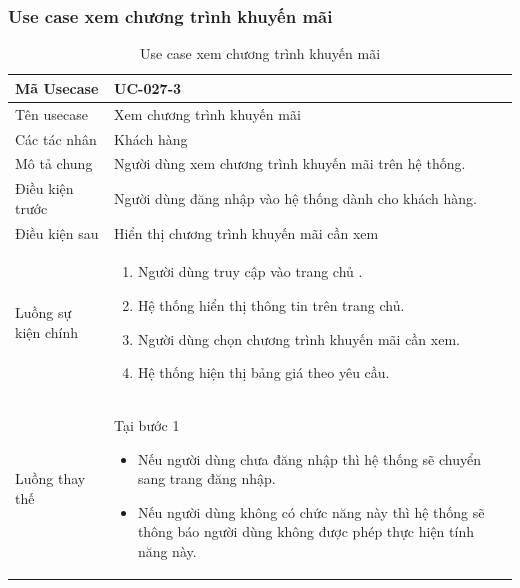 \documentclass[12pt,a4paper]{article}
\begin{document}

    \subsubsection*{Use case xem chương trình khuyến mãi}
    \begin{table}[H]
        \centering
        \begin{tabular}{|p{3.5cm}|p{11.5cm}|c|}
            \hline
            Mã Usecase      & UC-027-3                                               \\
            \hline
            Tên usecase     & Xem chương trình khuyến mãi                            \\
            \hline
            Các tác nhân    & Khách hàng                                             \\
            \hline
            Mô tả chung     & Người dùng xem chương trình khuyến mãi trên hệ thống.  \\
            \hline

            Điều kiện trước & Người dùng đăng nhập vào hệ thống dành cho khách hàng. \\
            \hline

            Điều kiện sau   & Hiển thị chương trình khuyến mãi cần xem               \\
            \hline

            Luồng sự kiện chính & \vspace{-.8cm}\begin{enumerate}
                                                    \item Người dùng truy cập vào trang chủ .
                                                    \item Hệ thống hiển thị thông tin trên trang chủ.
                                                    \item Người dùng chọn chương trình khuyến mãi cần xem.
                                                    \item Hệ thống hiện thị bảng giá theo yêu cầu.
            \end{enumerate}
            \\
            \hline
            Luồng thay thế & Tại bước 1\newline
            \vspace{-.8cm}\begin{itemize}
                              \item Nếu người dùng chưa đăng nhập thì hệ thống sẽ chuyển sang trang đăng nhập.
                              \item Nếu người dùng không có chức năng này thì hệ thống sẽ thông báo người dùng không được phép thực hiện tính năng này.
            \end{itemize}

            \\ \hline
        \end{tabular}
        \caption{Use case xem chương trình khuyến mãi}

    \end{table}
\end{document}
